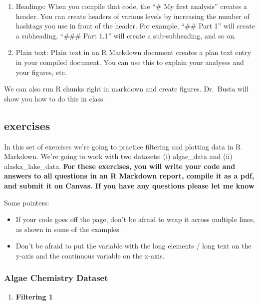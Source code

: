 \documentclass[
]{krantz}
\providecommand{\tightlist}{%
  \setlength{\itemsep}{0pt}\setlength{\parskip}{0pt}}
\begin{document}
\begin{enumerate}
\def\labelenumi{\arabic{enumi}.}
\item
  Headings: When you compile that code, the ``\# My first analysis'' creates a header. You can create headers of various levels by increasing the number of hashtags you use in front of the header. For example, ``\#\# Part 1'' will create a subheading, ``\#\#\# Part 1.1'' will create a sub-subheading, and so on.
\item
  Plain text: Plain text in an R Markdown document creates a plan text entry in your compiled document. You can use this to explain your analyses and your figures, etc.
\end{enumerate}

We can also run R chunks right in markdown and create figures. Dr.~Busta will show you how to do this in class.

\hypertarget{exercises}{%
\subsection{exercises}\label{exercises}}

In this set of exercises we're going to practice filtering and plotting data in R Markdown. We're going to work with two datasets: (i) algae\_data and (ii) alaska\_lake\_data. \textbf{For these exercises, you will write your code and answers to all questions in an R Markdown report, compile it as a pdf, and submit it on Canvas. If you have any questions please let me know}

Some pointers:

\begin{itemize}
\item
  If your code goes off the page, don't be afraid to wrap it across multiple lines, as shown in some of the examples.
\item
  Don't be afraid to put the variable with the long elements / long text on the y-axis and the continuous variable on the x-axis.
\end{itemize}

\hypertarget{algae-chemistry-dataset}{%
\subsubsection{Algae Chemistry Dataset}\label{algae-chemistry-dataset}}

\begin{enumerate}
\def\labelenumi{\arabic{enumi}.}
\tightlist
\item
  \textbf{Filtering 1}
\end{enumerate}
\end{document}
